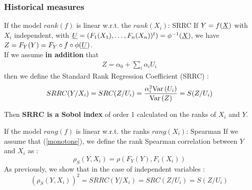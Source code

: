 \documentclass[8pt]{beamer}
\begin{document}
 
 
 

\begin{frame}
\frametitle{Historical measures}
 \small
  
 \begin{block}{If the model $rank(f)$ is  linear w.r.t. the $rank(X_i)$: SRRC}
   If $Y = f({\underline{X}})$ with \alert{$X_i$ independent}, with ${\underline{U}} = (F_1(X_1), \dots, F_n(X_n))^t) = \phi^{-1}({\underline{X}})$, we have $ Z = F_Y(Y) = F_Y \circ f \circ \phi ({\underline{U}})$. \\
   

 If we assume  {\bf in addition} that
    \alert{\begin{align}\label{monotone}
           Z = \alpha_0 +\sum_i \alpha_i U_i
           \end{align}
           }
       then we define the  \alert{ Standard Rank Regression Coefficient (SRRC)} :
          $$
     SRRC(Y/X_i) = SRC(Z / U_i) = \dfrac{\alpha_i^2 \mbox{Var}\left( U_i \right)}{\mbox{Var}\left( Z \right)} = S(Z/U_i)
    $$    
       
    Then {\bf SRRC is a Sobol index} of order 1 calculated on the ranks of $X_i$ and $Y$.
           
  \end{block} 

   
 \begin{block}{If the model $rang(f)$ is  linear w.r.t. the ranks $rang(X_i)$: Spearman}
  If we assume that (\ref{monotone}), we define the \alert{ rank Spearman correlation} between $Y$ and $X_i$ as :
  $$
 \rho_S(Y,X_i) = \rho(F_Y(Y),F_i(X_i))
  $$
  As previously, we show that in the case of  \alert{independent variables} :
  $$
  (\rho_S(Y,X_i))^2 = SRRC(Y/X_i) = SRC(Z / U_i) = S(Z/U_i)
  $$
 
\end{block}
 \end{frame}
\end{document}
